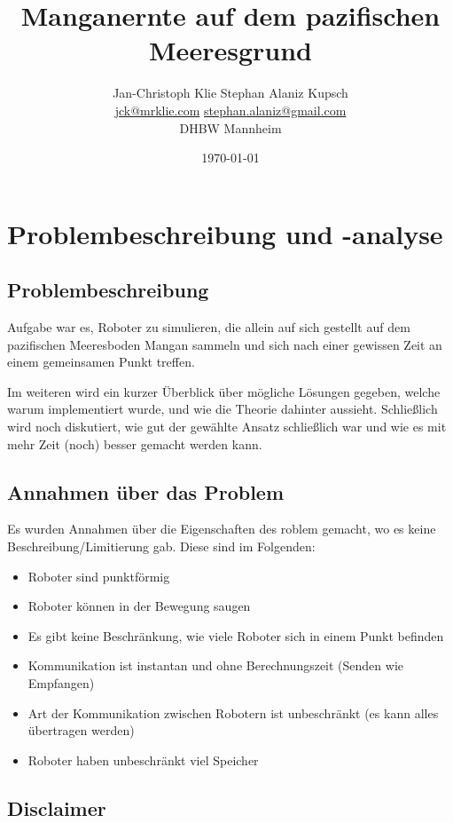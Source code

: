 \documentclass{article}
\title{Manganernte auf dem pazifischen Meeresgrund}
\date{\today}
\author{Jan-Christoph Klie \hspace{2cm} Stephan Alaniz Kupsch \\
\url{jck@mrklie.com} \hspace{2cm} \url{stephan.alaniz@gmail.com} \\
DHBW Mannheim }
\begin{document}

\maketitle
\tableofcontents 
\newpage

\section{Problembeschreibung und -analyse}

\subsection{Problembeschreibung}

Aufgabe war es, Roboter zu simulieren, die allein auf sich gestellt auf dem
pazifischen Meeresboden Mangan sammeln und sich nach einer gewissen Zeit 
an einem gemeinsamen Punkt treffen.

Im weiteren wird ein kurzer Überblick über mögliche Lösungen gegeben, welche
warum implementiert wurde, und wie die Theorie dahinter aussieht. Schließlich
wird noch diskutiert, wie gut der gewählte Ansatz schließlich war und wie es
mit mehr Zeit (noch) besser gemacht werden kann.

\subsection{Annahmen über das Problem}

Es wurden Annahmen über die Eigenschaften des roblem  gemacht, wo es keine
Beschreibung/Limitierung gab. Diese sind im Folgenden:

\begin{itemize}
\item Roboter sind punktförmig
\item Roboter können in der Bewegung saugen
\item Es gibt keine Beschränkung, wie viele Roboter sich in einem Punkt befinden
\item Kommunikation ist instantan und ohne Berechnungszeit (Senden wie Empfangen)
\item Art der Kommunikation zwischen Robotern ist unbeschränkt (es kann alles übertragen werden)
\item Roboter haben unbeschränkt viel Speicher
\end{itemize}

\subsection{Disclaimer}
\end{document}
